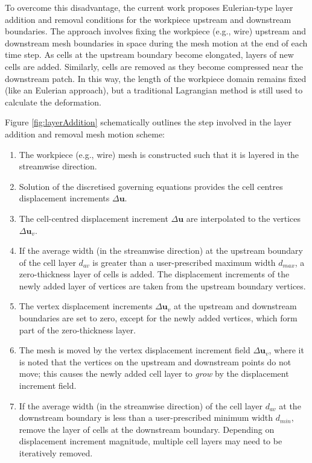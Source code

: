 \documentclass[sn-mathphys,Numbered]{sn-jnl}%
\newcommand{\bb}{\boldsymbol}
\begin{document}
To overcome this disadvantage, the current work proposes Eulerian-type layer addition and removal conditions for the workpiece upstream and downstream boundaries.
The approach involves fixing the workpiece (e.g., wire) upstream and downstream mesh boundaries in space during the mesh motion at the end of each time step.
As cells at the upstream boundary become elongated, layers of new cells are added.
Similarly, cells are removed as they become compressed near the downstream patch.
In this way, the length of the workpiece domain remains fixed (like an Eulerian approach), but a traditional Lagrangian method is still used to calculate the deformation.

Figure \ref{fig:layerAddition} schematically outlines the step involved in the layer addition and removal mesh motion scheme:
\begin{enumerate}[label=(\alph*)]
	\item The workpiece (e.g., wire) mesh is constructed such that it is layered in the streamwise direction.
	\item Solution of the discretised governing equations provides the cell centres displacement increments $\Delta \bb{u}$.
	\item The cell-centred displacement increment $\Delta \bb{u}$ are interpolated to the vertices $\Delta \bb{u}_v$.
	\item If the average width (in the streamwise direction) at the upstream boundary of the cell layer $d_{av}$ is greater than a user-prescribed maximum width $d_{max}$, a zero-thickness layer of cells is added. The displacement increments of the newly added layer of vertices are taken from the upstream boundary vertices.
	\item The vertex displacement increments $\Delta \bb{u}_v$ at the upstream and downstream boundaries are set to zero, except for the newly added vertices, which form part of the zero-thickness layer.
	\item The mesh is moved by the vertex displacement increment field $\Delta \bb{u}_v$, where it is noted that the vertices on the upstream and downstream points do not move; this causes the newly added cell layer to \emph{grow} by the displacement increment field. 
	\item If the average width (in the streamwise direction) of the cell layer $d_{av}$ at the downstream boundary is less than a user-prescribed minimum width $d_{min}$, remove the layer of cells at the downstream boundary. Depending on displacement increment magnitude, multiple cell layers may need to be iteratively removed.
\end{enumerate}
\end{document}
